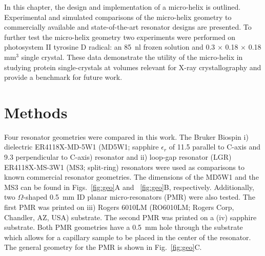 In this chapter, the design and implementation of a micro-helix is outlined. Experimental and simulated comparisons of the micro-helix geometry to commercially available and state-of-the-art resonator designs are presented. To further test the micro-helix geometry two experiments were performed on photosystem II tyrosine D radical: an 85~nl frozen solution and 0.3 $\times$ 0.18 $\times$ 0.18 mm$^3$ single crystal. These data demonstrate the utility of the micro-helix in studying protein single-crystals at volumes relevant for X-ray crystallography and provide a benchmark for future work.


\section{Methods}
Four resonator geometries were compared in this work. The Bruker Biospin i) dielectric ER4118X-MD-5W1 (MD5W1; sapphire $\epsilon_r$ of 11.5 parallel to C-axis and 9.3 perpendicular to C-axis) resonator and ii) loop-gap resonator (LGR) ER4118X-MS-3W1 (MS3; split-ring) resonators were used as comparisons to known commercial resonator geometries. The dimensions of the MD5W1 and the MS3 can be found in Figs.~\ref{fig:geo}A and ~\ref{fig:geo}B, respectively. Additionally, two $\Omega$-shaped 0.5~mm ID planar micro-resonators (PMR) were also tested. \cite{Suter2005, Suter2008, NARKOWICZ201379, suter2015} The first PMR was printed on iii) Rogers 6010LM (RO6010LM; Rogers Corp, Chandler, AZ, USA) substrate. The second PMR was printed on a (iv) sapphire substrate. Both PMR geometries have a 0.5~mm hole through the substrate which allows for a capillary sample to be placed in the center of the resonator. The general geometry for the PMR is shown in Fig.~\ref{fig:geo}C.

